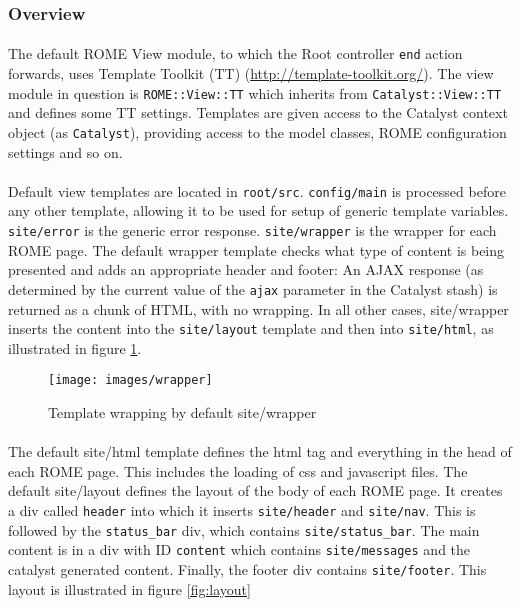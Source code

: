 \subsubsection{Overview}
\label{sec:view_overview}

\paragraph{}
The default ROME View module, to which the Root controller \texttt{end} action forwards, uses Template Toolkit (TT) (\url{http://template-toolkit.org/}). The view module in question is \texttt{ROME::View::TT} which inherits from \texttt{Catalyst::View::TT} and defines some TT settings. Templates are given access to the Catalyst context object (as \texttt{Catalyst}), providing access to the model classes, ROME configuration settings and so on. 

\paragraph{}
Default view templates are located in \texttt{root/src}.  \texttt{config/main} is processed before any other template, allowing it to be used for setup of generic template variables. \texttt{site/error} is the generic error response. \texttt{site/wrapper} is the wrapper for each ROME page. The default wrapper template checks what type of content is being presented and adds an appropriate header and footer: An AJAX response (as determined by the current value of the \texttt{ajax} parameter in the Catalyst stash) is returned as a chunk of HTML, with no wrapping. In all other cases, site/wrapper inserts the content into the \texttt{site/layout} template and then into \texttt{site/html}, as illustrated in figure \ref{fig:wrapper}. 

\begin{figure}
\centering
\caption{Template wrapping by default site/wrapper}\label{fig:wrapper}
\texttt{[image: images/wrapper]}
\end{figure}

\paragraph{}
The default site/html template defines the html tag and everything in the head of each ROME page. This includes the loading of css and javascript files.
The default site/layout defines the layout of the body of each ROME page. It creates a div called \texttt{header} into which it inserts \texttt{site/header} and \texttt{site/nav}. This is followed by the \texttt{status\_bar} div, which contains \texttt{site/status\_bar}. The main content is in a div with ID \texttt{content} which contains \texttt{site/messages} and the catalyst generated content. Finally, the footer div contains \texttt{site/footer}. This layout is illustrated in figure \ref{fig:layout}

